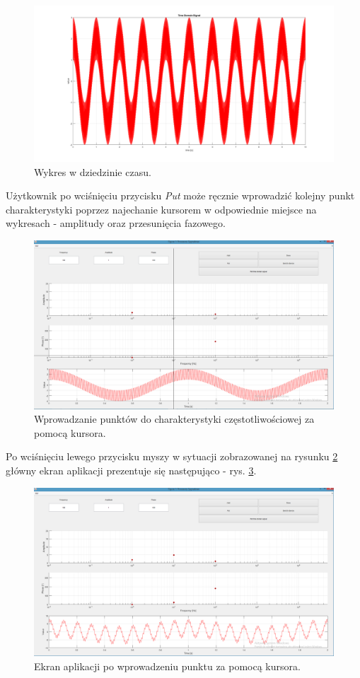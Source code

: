 \begin{figure}[h!]
	\centering
	\includegraphics[scale = 0.3]{fig/tds.png}
	\caption		
	{Wykres w dziedzinie czasu.}
	\label{tds}
\end{figure}
Użytkownik po wciśnięciu przycisku \textit{Put} może ręcznie wprowadzić kolejny punkt charakterystyki poprzez najechanie kursorem w odpowiednie miejsce na wykresach - amplitudy oraz przesunięcia fazowego.
\begin{figure}[h!]
	\centering
	\includegraphics[scale = 0.3]{fig/put.png}
	\caption		
	{Wprowadzanie punktów do charakterystyki częstotliwościowej za pomocą kursora.}
	\label{fig:put}
\end{figure}
Po wciśnięciu lewego przycisku myszy w sytuacji zobrazowanej na rysunku \ref{fig:put} główny ekran aplikacji prezentuje się następująco - rys. \ref{fig:after}.
\begin{figure}[h!]
	\centering
	\includegraphics[scale = 0.3]{fig/after.png}
	\caption		
	{Ekran aplikacji po wprowadzeniu punktu za pomocą kursora.}
	\label{fig:after}
\end{figure}

